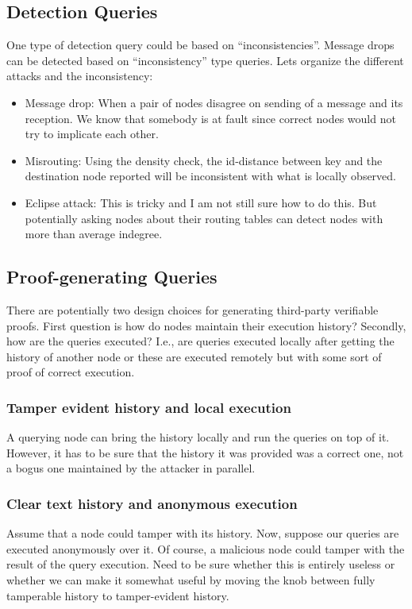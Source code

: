 \subsection{Detection Queries} 
One type of 
detection query could be based on ``inconsistencies''. Message drops 
can be detected based on ``inconsistency'' type queries. Lets organize 
the different attacks and the inconsistency: 
\begin{itemize} 
\item{Message drop:} When a pair of nodes disagree on sending of a 
  message and its reception. We know that somebody is at fault since 
  correct nodes would not try to implicate each other. 
\item{Misrouting:} Using the density check, the id-distance between key 
  and the destination node reported will be inconsistent with what is 
  locally observed. 
\item{Eclipse attack:} This is tricky and I am not still sure how to do 
  this. But potentially asking nodes about their routing tables can 
  detect nodes with more than average indegree. 
\end{itemize} 
 
 
\subsection{Proof-generating Queries} 
There are potentially two design choices for generating third-party 
verifiable proofs. First question is how do nodes maintain their 
execution history? Secondly, how are the queries executed? I.e., are 
queries executed locally after getting the history of another node or 
these are executed remotely but with some sort of proof of correct 
execution.  
 
\subsubsection{Tamper evident history and local execution} 
A querying node can bring the history locally and run the 
queries on top of it. However, it has to be sure that the history it 
was provided was a correct one, not a bogus one maintained by the 
attacker in parallel. 
 
\subsubsection{Clear text history and anonymous execution} 
Assume that a node could tamper with its history. Now, suppose our 
queries are executed anonymously over it. Of course, a malicious node 
could tamper with the result of the query execution. Need to be sure 
whether this is entirely useless or whether we can make it somewhat 
useful by moving the knob between fully tamperable history to 
tamper-evident history. 
 
